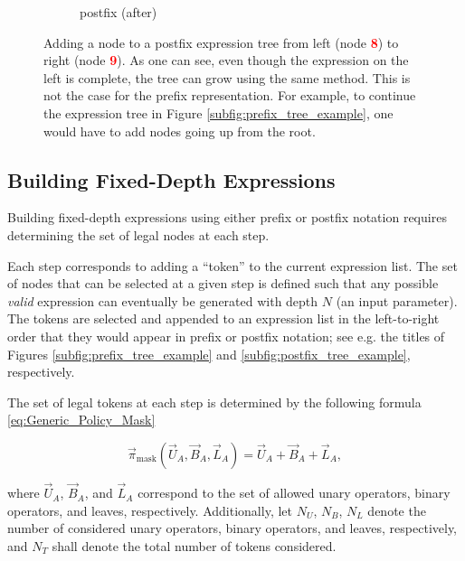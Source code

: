 \documentclass[runningheads]{llncs}
\begin{document}
\begin{figure}
\begin{subfigure}[b]{0.51\textwidth}
        \caption{postfix (after)}
    \end{subfigure}
    \caption{Adding a node to a postfix expression tree from left (node \textcolor{red}{\textbf{8}}) to right (node \textcolor{red}{\textbf{9}}). As one can see, even though the expression on the left is complete, the tree can grow using the same method. This is not the case for the prefix representation. For example, to continue the expression tree in Figure \ref{subfig:prefix_tree_example}, one would have to add nodes going up from the root.}
    \label{fig:postfix_add_1}
\end{figure}

\subsection{Building Fixed-Depth Expressions}
Building fixed-depth expressions using either prefix or postfix notation requires determining the set of legal nodes at each step. 
\par Each step corresponds to adding a ``token'' to the current expression list. The set of nodes that can be selected at a given step is defined such that any possible \emph{valid} expression can eventually be generated with depth $N$ (an input parameter). The tokens are selected and appended to an expression list in the left-to-right order that they would appear in prefix or postfix notation; see e.g. the titles of Figures \ref{subfig:prefix_tree_example} and \ref{subfig:postfix_tree_example}, respectively. 
\par The set of legal tokens at each step is determined by the following formula \ref{eq:Generic_Policy_Mask}

\begin{equation}
    \vec{\pi}_{\mathrm{mask}} \left(\vec{U}_{A}, \vec{B}_{A}, \vec{L}_{A}\right) = 
\vec{U}_{A}  + \vec{B}_{A} +\vec{L}_{A},
\label{eq:Generic_Policy_Mask}
\end{equation}

where $\vec{U}_{A}$, $ \vec{B}_{A}$, and $\vec{L}_{A}$ correspond to the set of allowed unary operators, binary operators, and leaves, respectively. Additionally, let $N_U$, $N_B$, $N_L$ denote the number of considered unary operators, binary operators, and leaves, respectively,  and $N_{T}$ shall denote the total number of tokens considered.
\end{document}
